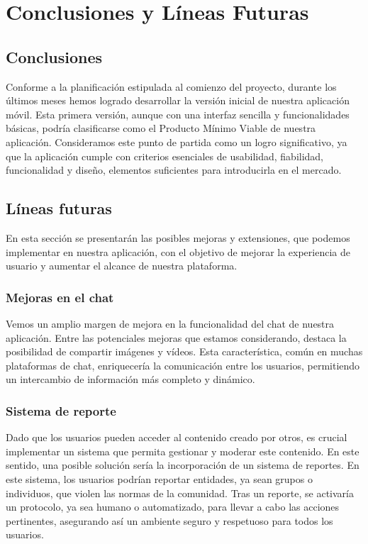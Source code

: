 \chapter{Conclusiones y Líneas Futuras}
    \section{Conclusiones}
        Conforme a la planificación estipulada al comienzo del proyecto, durante los últimos meses hemos logrado desarrollar la versión inicial de nuestra aplicación móvil. Esta primera versión, aunque con una interfaz sencilla y funcionalidades básicas, podría clasificarse como el Producto Mínimo Viable\cite{REF6} de nuestra aplicación. Consideramos este punto de partida como un logro significativo, ya que la aplicación cumple con criterios esenciales de usabilidad, fiabilidad, funcionalidad y diseño, elementos suficientes para introducirla en el mercado.

        \section{Líneas futuras}
            En esta sección se presentarán las posibles mejoras y extensiones, que podemos implementar en nuestra aplicación, con el objetivo de mejorar la experiencia de usuario y aumentar el alcance de nuestra plataforma.
  
        \subsection{Mejoras en el chat}
            Vemos un amplio margen de mejora en la funcionalidad del chat de nuestra aplicación. Entre las potenciales mejoras que estamos considerando, destaca la posibilidad de compartir imágenes y vídeos. Esta característica, común en muchas plataformas de chat, enriquecería la comunicación entre los usuarios, permitiendo un intercambio de información más completo y dinámico.
            
        \subsection{Sistema de reporte}
            Dado que los usuarios pueden acceder al contenido creado por otros, es crucial implementar un sistema que permita gestionar y moderar este contenido. En este sentido, una posible solución sería la incorporación de un sistema de reportes. En este sistema, los usuarios podrían reportar entidades, ya sean grupos o individuos, que violen las normas de la comunidad. Tras un reporte, se activaría un protocolo, ya sea humano o automatizado, para llevar a cabo las acciones pertinentes, asegurando así un ambiente seguro y respetuoso para todos los usuarios.

